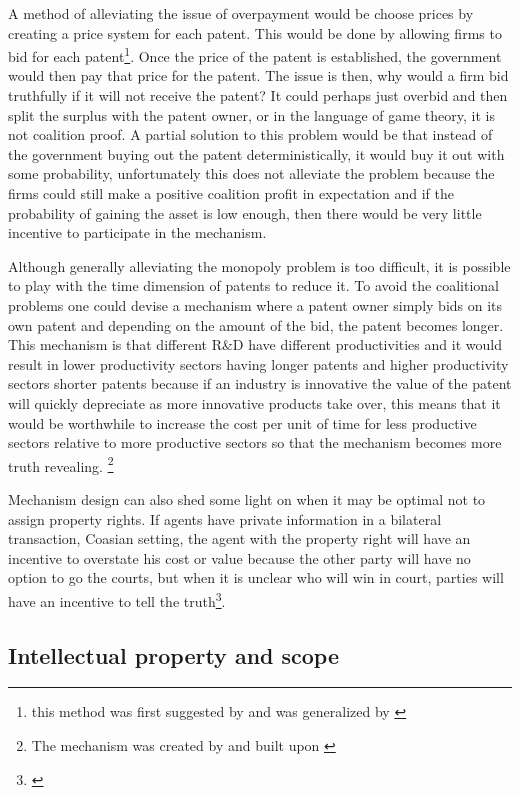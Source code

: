 \documentclass[12pt]{article}
\numberwithin{equation}{section}
\begin{document}
A method of alleviating the issue of overpayment would be choose prices by creating a price system for each patent. This would be done by allowing firms to bid for each patent\footnote{this method was first suggested by\cite{kremer_1998} and was generalized by \cite{weyl2012market}}. Once the price of the patent is established, the government would then pay that price for the patent. The issue is then, why would a firm bid truthfully if it will not receive the patent? It could perhaps just overbid and then split the surplus with the patent owner, or in the language of game theory, it is not coalition proof. A partial solution to this problem would be that instead of the government buying out the patent deterministically, it would buy it out with some probability, unfortunately this does not alleviate the problem because the firms could still make a positive coalition profit in expectation and if the probability of gaining the asset is low enough, then there would be very little incentive to participate in the mechanism. 

Although generally alleviating the monopoly problem is too difficult, it is possible to play with the time dimension of patents to reduce it. To avoid the coalitional problems one could devise a mechanism where a patent owner simply bids on its own patent and depending on the amount of the bid, the patent becomes longer. This mechanism is that different R\&D have different productivities and it would result in lower productivity sectors having longer patents and higher productivity sectors shorter patents because if an industry is innovative the value of the patent will quickly depreciate as more innovative products take over, this means that it would be worthwhile to increase the cost per unit of time for less productive sectors relative to more productive sectors so that the mechanism becomes more truth revealing.  \footnote{ The mechanism was created by \cite{Scotchmer1999} and built upon \cite{Cornelli1999}}

Mechanism design can also shed some light on when it may be optimal not to assign property rights. If agents have private information in a bilateral transaction, Coasian setting, the agent with the property right will have an incentive to overstate his cost or value because the other party will have no option to go the courts, but when it is unclear who will win in court, parties will have an incentive to tell the truth\footnote{\cite{schmitz2001coase}}. 



\subsection{Intellectual property and scope}
\end{document}
